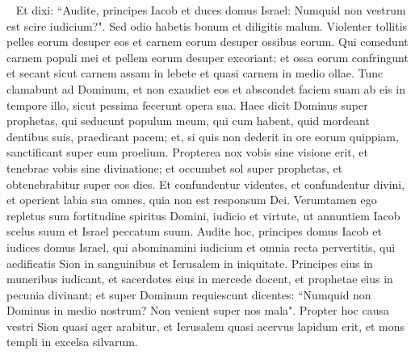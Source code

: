 \begin{biblechapter}   
\verse Et dixi: “Audite, principes Iacob et duces domus Israel: Numquid non vestrum est scire iudicium?". 
\verse Sed odio habetis bonum et diligitis malum. Violenter tollitis pelles eorum desuper eos et carnem eorum desuper ossibus eorum. 
\verse Qui comedunt carnem populi mei et pellem eorum desuper excoriant; et ossa eorum confringunt et secant sicut carnem assam in lebete et quasi carnem in medio ollae. 
\verse Tunc clamabunt ad Dominum, et non exaudiet eos et abscondet faciem suam ab eis in tempore illo, sicut pessima fecerunt opera sua. 
\verse Haec dicit Dominus super prophetas, qui seducunt populum meum, qui cum habent, quid mordeant dentibus suis, praedicant pacem; et, si quis non dederit in ore eorum quippiam, sanctificant super eum proelium. 
\verse Propterea nox vobis sine visione erit, et tenebrae vobis sine divinatione; et occumbet sol super prophetas, et obtenebrabitur super eos dies. 
\verse Et confundentur videntes, et confundentur divini, et operient labia sua omnes, quia non est responsum Dei. 
\verse Verumtamen ego repletus sum fortitudine spiritus Domini, iudicio et virtute, ut annuntiem Iacob scelus suum et Israel peccatum suum. 
\verse Audite hoc, principes domus Iacob et iudices domus Israel, qui abominamini iudicium et omnia recta pervertitis, 
\verse qui aedificatis Sion in sanguinibus et Ierusalem in iniquitate. 
\verse Principes eius in muneribus iudicant, et sacerdotes eius in mercede docent, et prophetae eius in pecunia divinant; et super Dominum requiescunt dicentes: “Numquid non Dominus in medio nostrum? Non venient super nos mala". 
\verse Propter hoc causa vestri Sion quasi ager arabitur, et Ierusalem quasi acervus lapidum erit, et mons templi in excelsa silvarum. 
\end{biblechapter}

